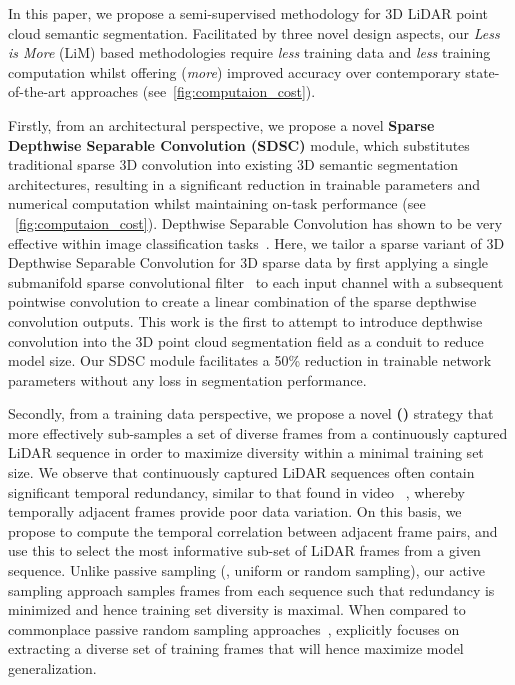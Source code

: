 \documentclass[10pt,twocolumn,letterpaper]{article}
\begin{document}
In this paper, we propose a semi-supervised methodology for 3D LiDAR point cloud semantic segmentation. Facilitated by three novel design aspects, our \textit{Less is More} (LiM) based methodologies require \textit{less} training data and \textit{less} training computation whilst offering (\textit{more}) improved accuracy over contemporary state-of-the-art approaches (see~\cref{fig:computaion_cost}).

Firstly, from an architectural perspective, we propose a novel \textbf{Sparse Depthwise Separable Convolution (SDSC)} module, which substitutes traditional sparse 3D convolution into existing 3D semantic segmentation architectures, resulting in a significant reduction in trainable parameters and numerical computation whilst maintaining on-task performance (see ~\cref{fig:computaion_cost}). Depthwise Separable Convolution has shown to be very effective within image classification tasks~\cite{chollet2017xception}. Here, we tailor a sparse variant of 3D Depthwise Separable Convolution for 3D sparse data by first applying a single submanifold sparse convolutional filter~\cite{graham2017submanifold,graham20183d} to each input channel with a subsequent pointwise convolution to create a linear combination of the sparse depthwise convolution outputs. This work is the first to attempt to introduce depthwise convolution into the 3D point cloud segmentation field as a conduit to reduce model size. Our SDSC module facilitates a 50\% reduction in trainable network parameters without any loss in segmentation performance.


Secondly, from a training data perspective, we propose a novel \textbf{{\samplfull} ({\samplshort})} strategy that more effectively sub-samples a set of diverse frames from a continuously captured LiDAR sequence in order to maximize diversity within a minimal training set size. We observe that continuously captured LiDAR sequences often contain significant temporal redundancy, similar to that found in video ~\cite{akramullah2014digital}, whereby temporally adjacent frames provide poor data variation. On this basis, we propose to compute the temporal correlation between adjacent frame pairs, and use this to select the most informative sub-set of LiDAR frames from a given sequence. Unlike passive sampling (\eg, uniform or random sampling), our active sampling approach samples frames from each sequence such that redundancy is minimized and hence training set diversity is maximal. When compared to commonplace passive random sampling approaches~\cite{jiang2021guided, kong2022lasermix, Unal_2022_CVPR}, {\samplshort} explicitly focuses on extracting a diverse set of training frames that will hence maximize model generalization.
\end{document}
